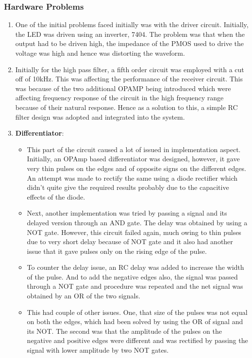 \documentclass{article}
\begin{document}
\subsubsection{Hardware Problems}
 \begin{enumerate}
\item One of the initial problems faced initially was with the driver circuit. Initially, the LED was driven using an inverter, 7404. The problem was that when the output had to be driven high, the impedance of the PMOS used to drive the voltage was high and hence was distorting the waveform.
\item Initially for the high pass filter, a fifth order circuit was employed with a cut off of 10kHz. This was affecting the performance of the receiver circuit. This was because of the two additional OPAMP being introduced which were affecting frequency response of the circuit in the high frequency range because of their natural response. Hence as a solution to this, a simple RC filter design was adopted and integrated into the system.
\item \textbf{Differentiator}:
  \begin{itemize}
  \item This part of the circuit caused a lot of issued in implementation aspect. Initially, an OPAmp based differentiator was designed, however, it gave very thin pulses on the edges and of opposite signs on the different edges. An attempt was made to rectify the same using a diode rectifier which didn’t quite give the required results probably due to the capacitive effects of the diode.
  \item Next, another implementation was tried by passing a signal and its delayed version through an AND gate. The delay was obtained by using a NOT gate. However, this circuit failed again, much owing to thin pulses due to very short delay because of NOT gate and it also had another issue that it gave pulses only on the rising edge of the pulse.
  \item To counter the delay issue, an RC delay was added to increase the width of the pulse. And to add the negative edges also, the signal was passed through a NOT gate and procedure was repeated and the net signal was obtained by an OR of the two signals.
  \item This had couple of other issues. One, that size of the pulses was not equal on both the edges, which had been solved by using the OR of signal and its NOT. The second was that the amplitude of the pulses on the negative and positive edges were different and was rectified by passing the signal with lower amplitude by two NOT gates.

\end{itemize}
\end{enumerate}
\end{document}
